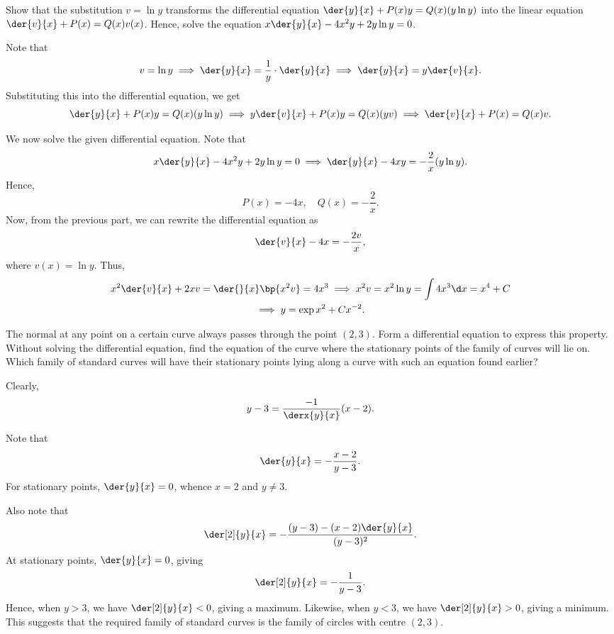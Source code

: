 \begin{problem}
    Show that the substitution $v = \ln y$ transforms the differential equation $\der{y}{x} + P(x) y = Q(x) (y \ln y)$ into the linear equation $\der{v}{x} + P(x) = Q(x)v(x)$. Hence, solve the equation $x \der{y}{x} - 4x^2 y + 2y \ln y = 0$.
\end{problem}
\begin{solution}
    Note that \[v = \ln y \implies \der{y}{x} = \frac1y \cdot \der{y}{x} \implies \der{y}{x} = y \der{v}{x}.\] Substituting this into the differential equation, we get \[\der{y}{x} + P(x) y = Q(x) (y \ln y) \implies y \der{v}{x} + P(x) y = Q(x) (y v) \implies \der{v}{x} + P(x) = Q(x) v.\]
    
    We now solve the given differential equation. Note that \[x \der{y}{x} - 4x^2 y + 2y \ln y = 0 \implies \der{y}{x} - 4x y = -\frac2x (y\ln y).\] Hence, \[P(x) = -4x, \quad Q(x) = -\frac2x.\] Now, from the previous part, we can rewrite the differential equation as \[\der{v}{x} - 4x = -\frac{2v}{x},\] where $v(x) = \ln y$. Thus,
    \begin{gather*}
        x^2 \der{v}{x} + 2x v = \der{}{x} \bp{x^2 v} = 4x^3 \implies x^2 v = x^2 \ln y = \int 4x^3 \d x = x^4 + C \\
        \implies y = \exp{x^2 + Cx^{-2}}.
    \end{gather*}
\end{solution}

\begin{problem}
    The normal at any point on a certain curve always passes through the point $(2, 3)$. Form a differential equation to express this property. Without solving the differential equation, find the equation of the curve where the stationary points of the family of curves will lie on. Which family of standard curves will have their stationary points lying along a curve with such an equation found earlier?
\end{problem}
\begin{solution}
    Clearly, \[y - 3 = \frac{-1}{\derx{y}{x}} (x- 2).\]
    
    Note that \[\der{y}{x} = -\frac{x-2}{y-3}.\] For stationary points, $\der{y}{x} = 0$, whence $x = 2$ and $y \neq 3$.
    
    Also note that \[\der[2]{y}{x} = -\frac{(y-3) - (x-2)\der{y}{x}}{(y-3)^2}.\] At stationary points, $\der{y}{x} = 0$, giving \[\der[2]{y}{x} = -\frac1{y-3}.\] Hence, when $y > 3$, we have $\der[2]{y}{x} < 0$, giving a maximum. Likewise, when $y < 3$, we have $\der[2]{y}{x} > 0$, giving a minimum. This suggests that the required family of standard curves is the family of circles with centre $(2, 3)$.
\end{solution}

